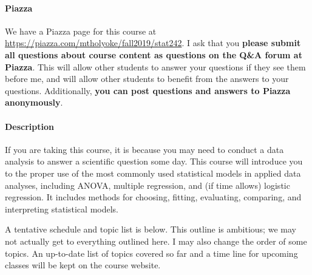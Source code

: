 \documentclass[11pt]{article}
\begin{document}
	\paragraph{Piazza}
	
	We have a Piazza page for this course at \url{https://piazza.com/mtholyoke/fall2019/stat242}.  I ask that you \textbf{please submit all questions about course content as questions on the Q{\&}A forum at Piazza}.  This will allow other students to answer your questions if they see them before me, and will allow other students to benefit from the answers to your questions.  Additionally, \textbf{you can post questions and answers to Piazza anonymously}.
	
	\paragraph{Description}
	
	If you are taking this course, it is because you may need to conduct a data analysis to answer a scientific question some day.
	This course will introduce you to the proper use of the most commonly used statistical models in applied data analyses, including ANOVA, multiple regression, and (if time allows) logistic regression.
	It includes methods for choosing, fitting, evaluating, comparing, and interpreting statistical models.
	
	A tentative schedule and topic list is below.  This outline is ambitious; we may not actually get to everything outlined here.  I may also change the order of some topics.  An up-to-date list of topics covered so far and a time line for upcoming classes will be kept on the course website.
	
\end{document}

